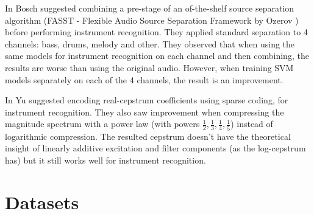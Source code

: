 \documentclass[journal]{IEEEtran}
\begin{document}
In \cite{bosch2012comparison} Bosch \etal suggested combining a pre-stage of an of-the-shelf source separation algorithm (FASST - Flexible Audio Source Separation Framework by Ozerov \etal \cite{ozerov2012general}) before performing instrument recognition. They applied standard separation to 4 channels: bass, drums, melody and other. They observed that when using the same models for instrument recognition on each channel and then combining, the results are worse than using the original audio. However, when training SVM models separately on each of the 4 channels, the result is an improvement.

In \cite{yu2014sparse} Yu \etal suggested encoding real-cepstrum coefficients using sparse coding, for instrument recognition. They also saw improvement when compressing the magnitude spectrum with a power law (with powers $\frac{1}{2},\frac{1}{3},\frac{1}{4},\frac{1}{5}$) instead of logarithmic compression. The resulted cepstrum doesn't have the theoretical insight of linearly additive excitation and filter components (as the log-cepstrum has) but it still works well for instrument recognition.

\section{Datasets}

\ifCLASSOPTIONcaptionsoff
  \newpage
\fi







\end{document}
